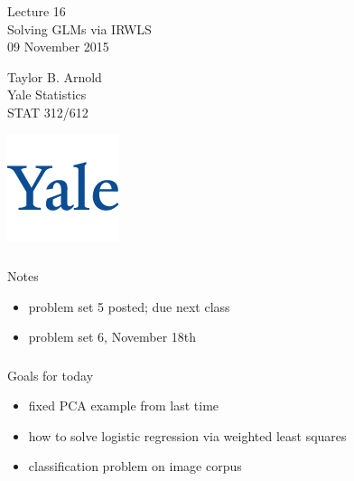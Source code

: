 



\begin{frame}[fragile] \frametitle{}

\vfill

{\fontsize{0.7cm}{0cm}\selectfont Lecture 16 \\\vspace{0.2cm}
Solving GLMs via IRWLS}\\\vspace{0.5cm}
09 November 2015

\vspace{2cm}

\begin{minipage}{0.6\textwidth}
Taylor B. Arnold \\
Yale Statistics \\
STAT 312/612
\end{minipage}
\hfill
\begin{minipage}{0.3\textwidth}\raggedleft
\includegraphics[scale=0.3]{../yale-logo.png}
\end{minipage}%

\end{frame}

\begin{frame}[fragile] \frametitle{}

{\color{yaleblue}\fontsize{16pt}{20pt}\selectfont Notes}

\begin{itemize}
\item problem set 5 posted; due next class \pause
\item problem set 6, November 18th
\end{itemize}

\end{frame}

\begin{frame}[fragile] \frametitle{}

{\color{yaleblue}\fontsize{16pt}{20pt}\selectfont Goals for today}

\begin{itemize}
\item fixed PCA example from last time
\item how to solve logistic regression via weighted least squares
\item classification problem on image corpus
\end{itemize}

\end{frame}

